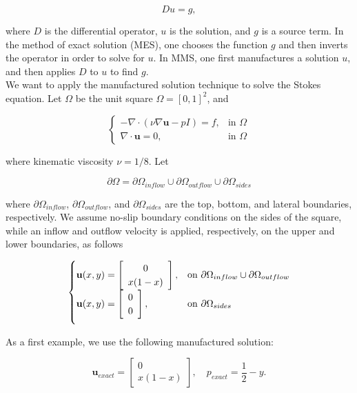 \documentclass[11pt,a4paper,titlepage]{report}
\begin{document}
\[
Du = g,
\]

where $D$ is the differential operator, $u$ is the solution, and $g$ is a source term. In the method of exact solution (MES), one chooses the function $g$ and then inverts the operator in order to solve for $u$. In MMS, one first manufactures a solution $u$, and then applies $D$ to $u$ to find $g$. \\

We want to apply the manufactured solution technique to solve the Stokes equation. Let $\Omega$ be the unit square $\Omega = [0,1]^2$, and

\vspace{0.2cm}
\[
\begin{cases}
- \nabla \cdot (\nu \nabla \mathbf{u} - pI) = f, & \mbox{in } \Omega \\
\nabla \cdot \mathbf{u} = 0, & \mbox{in } \Omega
\end{cases}
\]
\vspace{0.2cm}

where kinematic viscosity $\nu = 1/8$. Let

\[
\partial \Omega = \partial \Omega_{inflow} \cup \partial \Omega_{outflow} \cup \partial \Omega_{sides}
\]

where $\partial \Omega_{inflow}$, $\partial \Omega_{outflow}$, and $\partial \Omega_{sides}$ are the top, bottom, and lateral boundaries, respectively. We assume no-slip boundary conditions on the sides of the square, while an inflow and outflow velocity is applied, respectively, on the upper and lower boundaries, as follows

\[
\begin{cases}
\mathbf{u}(x,y) = \left[ \begin{array}{c} 0 \\ x(1-x) \end{array} \right] , & \mbox{on } \partial \Omega_{inflow} \cup \partial \Omega_{outflow} \\

\vspace{.2cm}

\mathbf{u}(x,y) = \left[ \begin{array}{c} 0 \\ 0 \end{array} \right], & \mbox{on } \partial \Omega_{sides}
\end{cases}
\]

As a first example, we use the following manufactured solution:

\[
\mathbf{u}_{exact} = \left[ \begin{array}{c} 0 \\ x(1-x) \end{array} \right], \quad
p_{exact} = \frac{1}{2}-y.
\]
\end{document}
